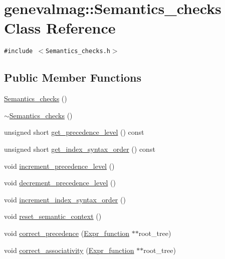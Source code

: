\hypertarget{classgenevalmag_1_1Semantics__checks}{
\section{genevalmag::Semantics\_\-checks Class Reference}
\label{classgenevalmag_1_1Semantics__checks}
}
{\tt \#include $<$Semantics\_\-checks.h$>$}

\subsection*{Public Member Functions}
\begin{CompactItemize}
\item 
\hyperlink{classgenevalmag_1_1Semantics__checks_332b806015b2d142ebaaa5ec5f7f6078}{Semantics\_\-checks} ()
\item 
\hyperlink{classgenevalmag_1_1Semantics__checks_77ad2416d9844554db3602939a9f462c}{$\sim$Semantics\_\-checks} ()
\item 
unsigned short \hyperlink{classgenevalmag_1_1Semantics__checks_d6b0e8d52900149631ae1d38ce61bf94}{get\_\-precedence\_\-level} () const 
\item 
unsigned short \hyperlink{classgenevalmag_1_1Semantics__checks_6d51fcd1f3ed2d6bf5470de0fb5b7770}{get\_\-index\_\-syntax\_\-order} () const 
\item 
void \hyperlink{classgenevalmag_1_1Semantics__checks_e9e488640f503bbd04a212f282f48826}{increment\_\-precedence\_\-level} ()
\item 
void \hyperlink{classgenevalmag_1_1Semantics__checks_0596851fd5b0e972d7b21a116141e154}{decrement\_\-precedence\_\-level} ()
\item 
void \hyperlink{classgenevalmag_1_1Semantics__checks_c755d47def82c431fa38053a58f231b6}{increment\_\-index\_\-syntax\_\-order} ()
\item 
void \hyperlink{classgenevalmag_1_1Semantics__checks_26db5c186627aa6fcfc8e69b26b7706c}{reset\_\-semantic\_\-context} ()
\item 
void \hyperlink{classgenevalmag_1_1Semantics__checks_5ad77ec398637204eea7e88b5d4fa74e}{correct\_\-precedence} (\hyperlink{classgenevalmag_1_1Expr__function}{Expr\_\-function} $\ast$$\ast$root\_\-tree)
\item 
void \hyperlink{classgenevalmag_1_1Semantics__checks_7cc9baa891ee17c0e4140014597c49d8}{correct\_\-associativity} (\hyperlink{classgenevalmag_1_1Expr__function}{Expr\_\-function} $\ast$$\ast$root\_\-tree)

\end{CompactItemize}
